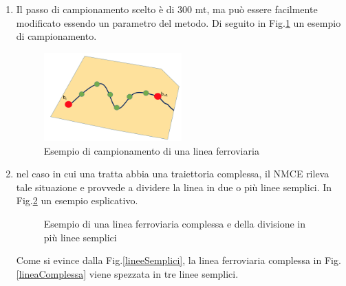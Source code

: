 \begin{enumerate}
\item Il passo di campionamento scelto è di 300 mt, ma può essere facilmente modificato essendo un parametro del metodo. Di seguito in Fig.\ref{puntiLinea} un esempio di campionamento.
\begin{figure}[bth]
	\centering
	\includegraphics[width=0.5\textwidth]{img/puntiLinea}
	\caption{Esempio di campionamento di una linea ferroviaria } 
	\label{puntiLinea}
\end{figure}

\item nel caso in cui una tratta abbia una traiettoria complessa, il NMCE rileva tale situazione e provvede a dividere la linea in due o più linee semplici. In Fig.\ref{fig:divisioneLinea} un esempio esplicativo.

\begin{figure}[bth]
\myfloatalign
{} \quad
{} 
\caption[dove]{Esempio di una linea ferroviaria complessa e della divisione in più linee semplici}
\label{fig:divisioneLinea}
\end{figure}
Come si evince dalla Fig.\ref{lineeSemplici}, la linea ferroviaria complessa in Fig.\ref{lineaComplessa} viene spezzata in tre linee semplici.


\end{enumerate}

